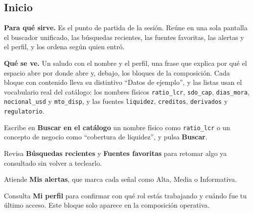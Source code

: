 \clearpage
\subsection{Inicio}

\textbf{Para qué sirve.} Es el punto de partida de la sesión. Reúne en una sola pantalla el
buscador unificado, las búsquedas recientes, las fuentes favoritas, las alertas y el perfil, y los
ordena según quien entró.

\textbf{Qué se ve.} Un saludo con el nombre y el perfil, una frase que explica por qué el espacio
abre por donde abre y, debajo, los bloques de la composición. Cada bloque con contenido lleva su
distintivo \enquote{Datos de ejemplo}, y las listas usan el vocabulario real del catálogo: los
nombres físicos \texttt{ratio\_lcr}, \texttt{sdo\_cap}, \texttt{dias\_mora},
\texttt{nocional\_usd} y \texttt{mto\_disp}, y las fuentes \texttt{liquidez}, \texttt{creditos},
\texttt{derivados} y \texttt{regulatorio}.


\begin{uxpreg}
  \item Escribe en \textbf{Buscar en el catálogo} un nombre físico como \texttt{ratio\_lcr} o un
    concepto de negocio como \enquote{cobertura de liquidez}, y pulsa \textbf{Buscar}.
  \item Revisa \textbf{Búsquedas recientes} y \textbf{Fuentes favoritas} para retomar algo ya
    consultado sin volver a teclearlo.
  \item Atiende \textbf{Mis alertas}, que marca cada señal como Alta, Media o Informativa.
  \item Consulta \textbf{Mi perfil} para confirmar con qué rol estás trabajando y cuándo fue tu
    último acceso. Este bloque solo aparece en la composición operativa.
\end{uxpreg}

